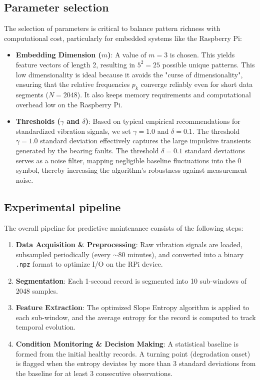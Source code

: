 \documentclass{article}
\begin{document}
\subsection{Parameter selection}
The selection of parameters is critical to balance pattern richness with computational cost, particularly for embedded systems like the Raspberry Pi:
\begin{itemize}
    \item \textbf{Embedding Dimension ($m$)}: A value of $m=3$ is chosen. This yields feature vectors of length 2, resulting in $5^2 = 25$ possible unique patterns. This low dimensionality is ideal because it avoids the "curse of dimensionality", ensuring that the relative frequencies $p_k$ converge reliably even for short data segments ($N = 2048$). It also keeps memory requirements and computational overhead low on the Raspberry Pi.
    \item \textbf{Thresholds ($\gamma$ and $\delta$)}: Based on typical empirical recommendations for standardized vibration signals, we set $\gamma = 1.0$ and $\delta = 0.1$. The threshold $\gamma = 1.0$ standard deviation effectively captures the large impulsive transients generated by the bearing faults. The threshold $\delta = 0.1$ standard deviations serves as a noise filter, mapping negligible baseline fluctuations into the $0$ symbol, thereby increasing the algorithm's robustness against measurement noise.
\end{itemize}


\subsection{Experimental pipeline}
The overall pipeline for predictive maintenance consists of the following steps:
\begin{enumerate}
    \item \textbf{Data Acquisition \& Preprocessing}: Raw vibration signals are loaded, subsampled periodically (every $\sim 80$ minutes), and converted into a binary \texttt{.npz} format to optimize I/O on the RPi device.
    \item \textbf{Segmentation}: Each 1-second record is segmented into 10 sub-windows of 2048 samples.
    \item \textbf{Feature Extraction}: The optimized Slope Entropy algorithm is applied to each sub-window, and the average entropy for the record is computed to track temporal evolution.
    \item \textbf{Condition Monitoring \& Decision Making}: A statistical baseline is formed from the initial healthy records. A turning point (degradation onset) is flagged when the entropy deviates by more than 3 standard deviations from the baseline for at least 3 consecutive observations.
\end{enumerate}
\end{document}
